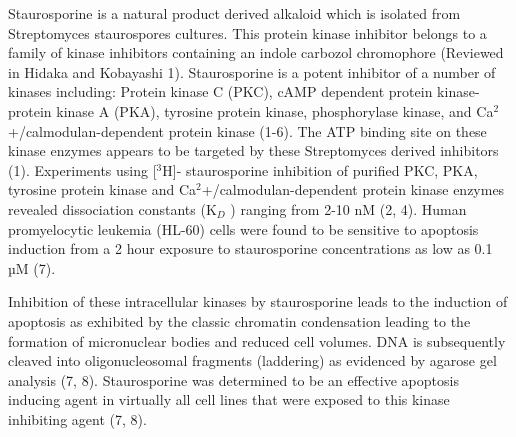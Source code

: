 \documentclass[10pt,letterpaper]{protocol}
\begin{document}



\begin{fullwidth}
\makeheader
\end{fullwidth}



Staurosporine is a natural product derived alkaloid which is isolated from Streptomyces staurospores cultures.  This protein kinase inhibitor belongs to a family of kinase inhibitors containing an indole carbozol chromophore (Reviewed in Hidaka and Kobayashi 1).  Staurosporine is a potent inhibitor of a number of kinases including: Protein kinase C (PKC), cAMP dependent protein kinase- protein kinase A (PKA), tyrosine protein kinase, phosphorylase kinase, and Ca$^2$+/calmodulan-dependent protein kinase (1-6).  The ATP binding site on these kinase enzymes appears to be targeted by these Streptomyces derived inhibitors (1).  Experiments using [$^3$H]- staurosporine inhibition of purified PKC, PKA, tyrosine protein kinase and Ca$^2$+/calmodulan-dependent protein kinase enzymes revealed dissociation constants (K$_D$ ) ranging from 2-10 nM (2, 4).   Human promyelocytic leukemia (HL-60) cells were found to be sensitive to apoptosis induction from a 2 hour exposure to staurosporine concentrations as low as 0.1 µM (7).  

\divider

Inhibition of these intracellular kinases by staurosporine leads to the induction of apoptosis as exhibited by the classic chromatin condensation leading to the formation of micronuclear bodies and reduced cell volumes. DNA is subsequently cleaved into oligonucleosomal fragments (laddering) as evidenced by agarose gel analysis (7, 8). Staurosporine was determined to be an effective apoptosis inducing agent in virtually all cell lines that were exposed to this kinase inhibiting agent (7, 8).
\end{document}
